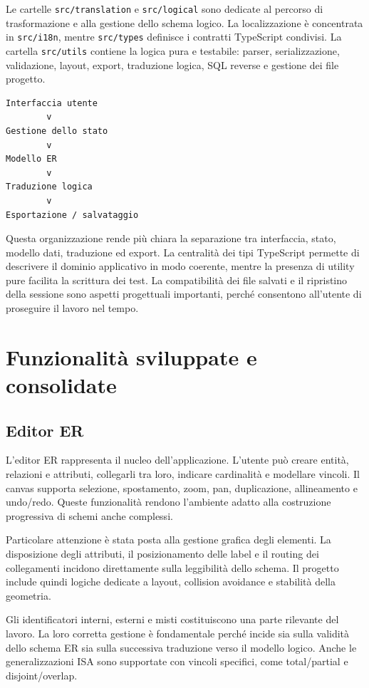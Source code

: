 \documentclass{unipd-thesis-modern}
\begin{document}
Le cartelle \texttt{src/translation} e \texttt{src/logical} sono dedicate al percorso di trasformazione e alla gestione dello schema logico. La localizzazione è concentrata in \texttt{src/i18n}, mentre \texttt{src/types} definisce i contratti TypeScript condivisi. La cartella \texttt{src/utils} contiene la logica pura e testabile: parser, serializzazione, validazione, layout, export, traduzione logica, SQL reverse e gestione dei file progetto.

\begin{verbatim}
Interfaccia utente
        v
Gestione dello stato
        v
Modello ER
        v
Traduzione logica
        v
Esportazione / salvataggio
\end{verbatim}

Questa organizzazione rende più chiara la separazione tra interfaccia, stato, modello dati, traduzione ed export. La centralità dei tipi TypeScript permette di descrivere il dominio applicativo in modo coerente, mentre la presenza di utility pure facilita la scrittura dei test. La compatibilità dei file salvati e il ripristino della sessione sono aspetti progettuali importanti, perché consentono all'utente di proseguire il lavoro nel tempo.

\chapter{Funzionalità sviluppate e consolidate}

\section{Editor ER}

L'editor ER rappresenta il nucleo dell'applicazione. L'utente può creare entità, relazioni e attributi, collegarli tra loro, indicare cardinalità e modellare vincoli. Il canvas supporta selezione, spostamento, zoom, pan, duplicazione, allineamento e undo/redo. Queste funzionalità rendono l'ambiente adatto alla costruzione progressiva di schemi anche complessi.

Particolare attenzione è stata posta alla gestione grafica degli elementi. La disposizione degli attributi, il posizionamento delle label e il routing dei collegamenti incidono direttamente sulla leggibilità dello schema. Il progetto include quindi logiche dedicate a layout, collision avoidance e stabilità della geometria.

Gli identificatori interni, esterni e misti costituiscono una parte rilevante del lavoro. La loro corretta gestione è fondamentale perché incide sia sulla validità dello schema ER sia sulla successiva traduzione verso il modello logico. Anche le generalizzazioni ISA sono supportate con vincoli specifici, come total/partial e disjoint/overlap.
\end{document}

